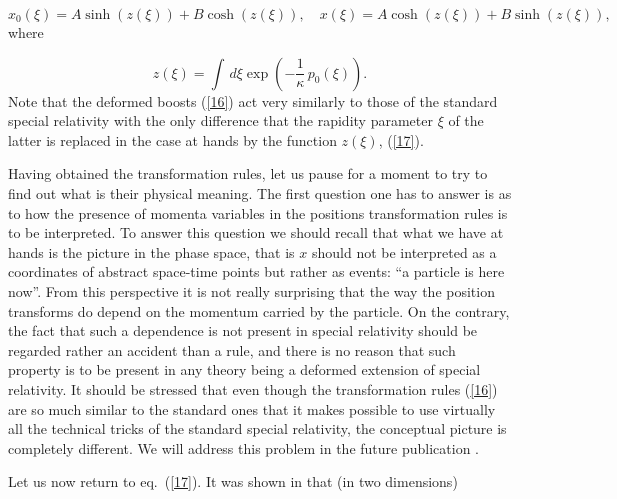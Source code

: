\documentclass[a4paper,a4paper]{article}
\begin{document}
\begin{equation}\label{16}
 x_0(\xi) = A \sinh(z(\xi)) + B \cosh(z(\xi)), \quad x(\xi) = A \cosh(z(\xi)) + B \sinh(z(\xi)),
\end{equation}
where

\begin{equation}\label{17}
  z(\xi) = \int \, d\xi \exp\left( -\frac1\kappa \,p_0(\xi) \right).
\end{equation}
Note that the deformed boosts (\ref{16}) act very similarly to those of the standard special relativity with the only difference that the rapidity parameter $\xi$ of the latter is replaced in the case at hands by the function $z(\xi)$, (\ref{17}). 
\newline




Having obtained the transformation rules, let us pause for a moment to try to find out what is their physical meaning. The first question one has to answer is as to how the presence of momenta variables in the positions transformation rules is to be interpreted. To answer this question we should recall that what we have at hands is the picture in the phase space, that is $x$ should not be interpreted as a coordinates of abstract space-time points but rather as events: ``a particle is here now''. From this perspective it is not really surprising that the way the position transforms do depend on the momentum carried by the particle. On  the contrary, the fact that such a dependence is not present in special relativity should be regarded rather an accident than a rule, and there is no reason that such property is to be present in any theory being a deformed extension of special relativity. It should be stressed that even though the transformation rules (\ref{16}) are so much similar to the standard ones that it makes possible to use virtually all the technical tricks of the standard special relativity, the conceptual picture is completely different. We will address this problem in the future publication \cite{gacjkgfut}.

Let us now return to eq.~(\ref{17}). It was shown in \cite{rbgacjkg} that (in two dimensions)
\end{document}
